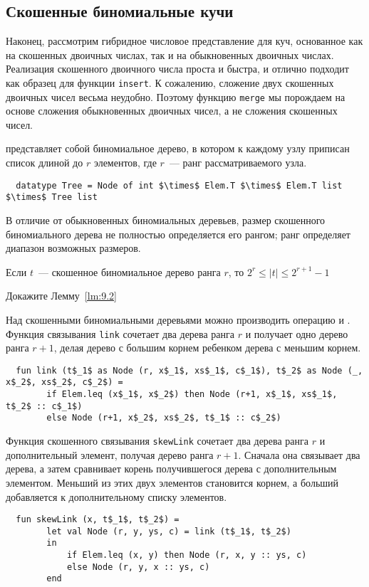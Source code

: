 \subsection{Скошенные биномиальные кучи}
\label{sc:9.3.2}

\begin{frame}[fragile]{}



Наконец, рассмотрим гибридное числовое представление для куч,
основанное как на скошенных двоичных числах, так и на обыкновенных
двоичных числах. Реализация скошенного двоичного числа проста и
быстра, и отлично подходит как образец для функции
\lstinline!insert!. К сожалению, сложение двух скошенных двоичных
чисел весьма неудобно. Поэтому функцию \lstinline!merge! мы порождаем
на основе сложения обыкновенных двоичных чисел, а не сложения
скошенных чисел.

 представляет
собой биномиальное дерево, в котором к каждому узлу приписан список
длиной до $r$ элементов, где $r$~--- ранг рассматриваемого узла.
\begin{lstlisting}
  datatype Tree = Node of int $\times$ Elem.T $\times$ Elem.T list $\times$ Tree list
\end{lstlisting}
В отличие от обыкновенных биномиальных деревьев, размер скошенного
биномиального дерева не полностью определяется его рангом; ранг
определяет диапазон возможных размеров.

\begin{lemma}
  \label{lm:9.2}
  Если $t$~--- скошенное биномиальное дерево ранга $r$, то $2^r \le
  |t| \le 2^{r+1} - 1$
  \begin{exercise}\label{ex:9.15}
    Докажите Лемму~\ref{lm:9.2}
  \end{exercise}
\end{lemma}

Над скошенными биномиальными деревьями можно производить операцию
 и .
Функция связывания \lstinline!link! сочетает два дерева ранга $r$ и
получает одно дерево ранга $r+1$, делая дерево с большим корнем
ребенком дерева с меньшим корнем.
\begin{lstlisting}
  fun link (t$_1$ as Node (r, x$_1$, xs$_1$, c$_1$), t$_2$ as Node (_, x$_2$, xs$_2$, c$_2$) =
        if Elem.leq (x$_1$, x$_2$) then Node (r+1, x$_1$, xs$_1$, t$_2$ :: c$_1$)
        else Node (r+1, x$_2$, xs$_2$, t$_1$ :: c$_2$)
\end{lstlisting}
Функция скошенного связывания \lstinline!skewLink! сочетает два дерева
ранга $r$ и дополнительный элемент, получая дерево ранга
$r+1$. Сначала она связывает два дерева, а затем сравнивает корень
получившегося дерева с дополнительным элементом. Меньший из этих двух
элементов становится корнем, а больший добавляется к дополнительному
списку элементов.
\begin{lstlisting}
  fun skewLink (x, t$_1$, t$_2$) =
        let val Node (r, y, ys, c) = link (t$_1$, t$_2$)
        in
            if Elem.leq (x, y) then Node (r, x, y :: ys, c)
            else Node (r, y, x :: ys, c)
        end
\end{lstlisting}


\end{frame}
